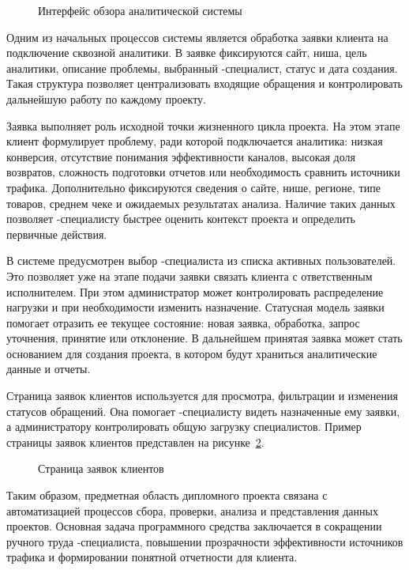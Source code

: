 \begin{figure}[H]
    \centering
    \caption{Интерфейс обзора аналитической системы}
    \label{fig:analytics-overview}
\end{figure}

Одним из начальных процессов системы является обработка заявки клиента на подключение сквозной аналитики. В заявке фиксируются сайт, ниша, цель аналитики, описание проблемы, выбранный -специалист, статус и дата создания. Такая структура позволяет централизовать входящие обращения и контролировать дальнейшую работу по каждому  проекту.

Заявка выполняет роль исходной точки жизненного цикла проекта. На этом этапе клиент формулирует проблему, ради которой подключается аналитика: низкая конверсия, отсутствие понимания эффективности каналов, высокая доля возвратов, сложность подготовки отчетов или необходимость сравнить источники трафика. Дополнительно фиксируются сведения о сайте, нише, регионе, типе товаров, среднем чеке и ожидаемых результатах анализа. Наличие таких данных позволяет -специалисту быстрее оценить контекст проекта и определить первичные действия.

В системе предусмотрен выбор -специалиста из списка активных пользователей. Это позволяет уже на этапе подачи заявки связать клиента с ответственным исполнителем. При этом администратор может контролировать распределение нагрузки и при необходимости изменить назначение. Статусная модель заявки помогает отразить ее текущее состояние: новая заявка, обработка, запрос уточнения, принятие или отклонение. В дальнейшем принятая заявка может стать основанием для создания проекта, в котором будут храниться аналитические данные и отчеты.

Страница заявок клиентов используется для просмотра, фильтрации и изменения статусов обращений. Она помогает -специалисту видеть назначенные ему заявки, а администратору контролировать общую загрузку специалистов. Пример страницы заявок клиентов представлен на рисунке~\ref{fig:client-applications}.

\begin{figure}[H]
    \centering
    \caption{Страница заявок клиентов}
    \label{fig:client-applications}
\end{figure}

Таким образом, предметная область дипломного проекта связана с автоматизацией процессов сбора, проверки, анализа и представления данных  проектов. Основная задача программного средства заключается в сокращении ручного труда -специалиста, повышении прозрачности эффективности источников трафика и формировании понятной отчетности для клиента.


